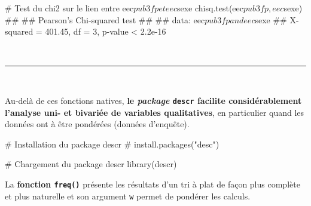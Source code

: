 \documentclass[12pt,twosided, notitlepage]{book}
\newenvironment{Shaded}{}{}
\newcommand{\KeywordTok}[1]{\textcolor[rgb]{0.00,0.00,1.00}{{#1}}}
\newcommand{\CommentTok}[1]{\textcolor[rgb]{0.00,0.50,0.00}{{#1}}}
\newcommand{\NormalTok}[1]{{#1}}
\renewenvironment{Shaded}{\begin{snugshade}}{\end{snugshade}}
\begin{document}
\begin{Shaded}
\begin{Highlighting}[]
\CommentTok{# Test du chi2 sur le lien entre eec$pub3fp et eec$sexe}
\KeywordTok{chisq.test}\NormalTok{(eec$pub3fp, eec$sexe)}
  \NormalTok{## }
  \NormalTok{##    Pearson's Chi-squared test}
  \NormalTok{## }
  \NormalTok{## data:  eec$pub3fp and eec$sexe}
  \NormalTok{## X-squared = 401.45, df = 3, p-value < 2.2e-16}
\end{Highlighting}
\end{Shaded}

~

\begin{center}\rule{0.5\linewidth}{\linethickness}\end{center}

~

Au-delà de ces fonctions natives, \textbf{le \emph{package}
\texttt{descr} facilite considérablement l'analyse uni- et bivariée de
variables qualitatives}, en particulier quand les données ont à être
pondérées (données d'enquête).

\begin{Shaded}
\begin{Highlighting}[]
\CommentTok{# Installation du package descr}
\CommentTok{# install.packages("desc")}

\CommentTok{# Chargement du package descr}
\KeywordTok{library}\NormalTok{(descr)}
\end{Highlighting}
\end{Shaded}

La \textbf{fonction \texttt{freq()}} présente les
résultats d'un tri à plat de façon plus complète et plus naturelle et
son argument \texttt{w} permet de pondérer les calculs.

\begin{Shaded}
\end{Shaded}
\end{document}
